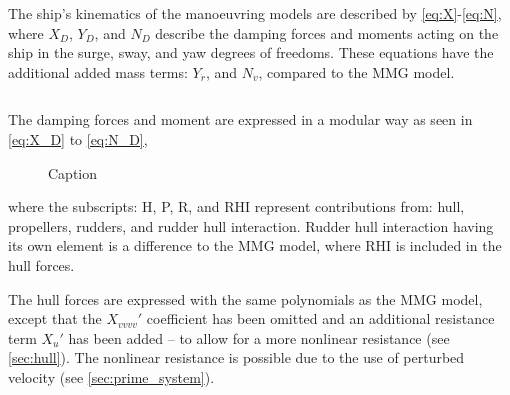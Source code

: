 The ship's kinematics of the manoeuvring models are described by \autoref{eq:X}-\autoref{eq:N}, where $X_D$, $Y_D$, and $N_D$ describe the damping forces and moments acting on the ship in the surge, sway, and yaw degrees of freedoms. These equations have the additional added mass terms: $Y_{\dot{r}}$, and $N_{\dot{v}}$, compared to the MMG model.

\begin{equation}
    \label{eq:X}
    
\end{equation}
%
\begin{equation}
    \label{eq:Y}
    
\end{equation}
%
\begin{equation}
    \label{eq:N}
    
\end{equation}

The damping forces and moment are expressed in a modular way as seen in \autoref{eq:X_D} to \autoref{eq:N_D},
\begin{equation}
    \label{eq:X_D}
    
\end{equation}
%
\begin{equation}
    \label{eq:Y_D}
    
\end{equation}
%
\begin{equation}
    \label{eq:N_D}
    
\end{equation}
%
\begin{figure}[h]
    \centering
    
    \caption{Caption}
    \label{fig:enter-label}
\end{figure}

where the subscripts: H, P, R, and RHI represent contributions from: hull, propellers, rudders, and rudder hull interaction. Rudder hull interaction having its own element is a difference to the MMG model, where RHI is included in the hull forces.

The hull forces are expressed with the same polynomials as the MMG model, except that the ${X_{vvvv}}'$ coefficient has been omitted and an additional resistance term ${X_u}'$ has been added -- to allow for a more nonlinear resistance (see \autoref{sec:hull}). The nonlinear resistance is possible due to the use of perturbed velocity (see \autoref{sec:prime_system}).

